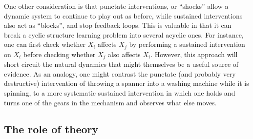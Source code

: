 \documentclass{cambridge7A}%
\begin{document}
One other consideration is that punctate interventions, or ``shocks'' allow a dynamic system to continue to play out as before,  while sustained interventions also act as ``blocks'', and stop feedback loops.  This is valuable in that it can break a cyclic structure learning problem into several acyclic ones.  For instance, one can first check whether $X_i$ affects $X_j$ by performing a sustained intervention on $X_i$ before checking whether $X_j$ also affects $X_i$.  However, this approach will short circuit the natural dynamics that might themselves be a useful source of evidence.  As an analogy, one might contrast the punctate (and probably very destructive) intervention of throwing a spanner into a washing machine while it is spinning, to a more systematic sustained intervention in which one holds and turns one of the gears in the mechanism and observes what else moves.

\subsection{The role of theory}
\end{document}
